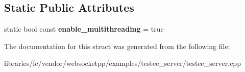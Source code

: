 \subsection*{Static Public Attributes}
\begin{DoxyCompactItemize}
\item 
\mbox{\label{structtestee__config_1_1transport__config_a634fbd34a857da1884aaad2139ae6890}} 
static bool const {\bfseries enable\+\_\+multithreading} = true
\end{DoxyCompactItemize}


The documentation for this struct was generated from the following file\+:\begin{DoxyCompactItemize}
\item 
libraries/fc/vendor/websocketpp/examples/testee\+\_\+server/testee\+\_\+server.\+cpp\end{DoxyCompactItemize}
